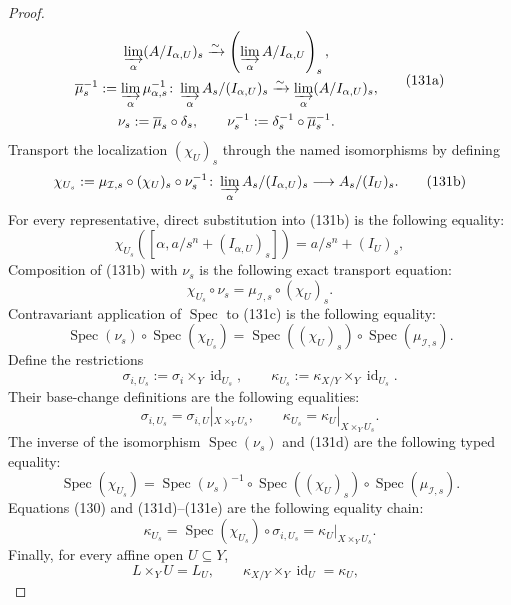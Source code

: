 \begin{proof}
\[\begin{gathered}
      \varinjlim_\alpha(A/I_{\alpha,U})_s
        \xrightarrow{\sim}
      \left(\varinjlim_\alpha A/I_{\alpha,U}\right)_s,\\
    \overline\mu_s^{-1}:=
      \varinjlim_\alpha\mu_{\alpha,s}^{-1}\colon
      \varinjlim_\alpha A_s/(I_{\alpha,U})_s
        \xrightarrow{\sim}
      \varinjlim_\alpha(A/I_{\alpha,U})_s,\\
    \nu_s:=\overline\mu_s\circ\delta_s,\qquad
    \nu_s^{-1}:=\delta_s^{-1}\circ\overline\mu_s^{-1}.            
  \end{gathered} \tag{131a}
  \]
  Transport the localization $(\chi_U)_s$ through the named isomorphisms by
  defining
  \[
    \chi_{U_s}:=
      \mu_{\mathcal I,s}\circ(\chi_U)_s\circ\nu_s^{-1}\colon
      \varinjlim_\alpha A_s/(I_{\alpha,U})_s
        \longrightarrow A_s/(I_U)_s.                             \tag{131b}
  \]
  For every representative, direct substitution into (131b) is the following
  equality:
  \[
    \chi_{U_s}\!\left(
      [\alpha,a/s^n+(I_{\alpha,U})_s]\right)
      =a/s^n+(I_U)_s,
  \]
  Composition of (131b) with $\nu_s$ is the following exact transport
  equation:
  \[
    \chi_{U_s}\circ\nu_s
      =\mu_{\mathcal I,s}\circ(\chi_U)_s.                         \tag{131c}
  \]
  Contravariant application of $\operatorname{Spec}$ to (131c) is the
  following equality:
  \[
    \operatorname{Spec}(\nu_s)\circ\operatorname{Spec}(\chi_{U_s})
      =\operatorname{Spec}((\chi_U)_s)
         \circ\operatorname{Spec}(\mu_{\mathcal I,s}).            \tag{131d}
  \]
  Define the restrictions
  \[
    \sigma_{i,U_s}:=\sigma_i\times_Y\operatorname{id}_{U_s},
    \qquad
    \kappa_{U_s}:=\kappa_{X/Y}\times_Y\operatorname{id}_{U_s}.
  \]
  Their base-change definitions are the following equalities:
  \[
    \sigma_{i,U_s}
      =\sigma_{i,U}|_{X\times_YU_s},
    \qquad
    \kappa_{U_s}
      =\kappa_U|_{X\times_YU_s}.                                  \tag{131e}
  \]
  The inverse of the isomorphism $\operatorname{Spec}(\nu_s)$ and (131d)
  are the following typed equality:
  \[
    \operatorname{Spec}(\chi_{U_s})
      =\operatorname{Spec}(\nu_s)^{-1}
        \circ\operatorname{Spec}((\chi_U)_s)
        \circ\operatorname{Spec}(\mu_{\mathcal I,s}).             \tag{131d'}
  \]
  Equations (130) and (131d)--(131e) are the following equality chain:
  \[
    \kappa_{U_s}
      =\operatorname{Spec}(\chi_{U_s})\circ\sigma_{i,U_s}
      =\kappa_U|_{X\times_YU_s}.
  \]
  Finally, for every affine open $U\subseteq Y$,
  \[
    L\times_YU=L_U,
    \qquad
    \kappa_{X/Y}\times_Y\operatorname{id}_U=\kappa_U,
    \qquad
\]
\end{proof}
